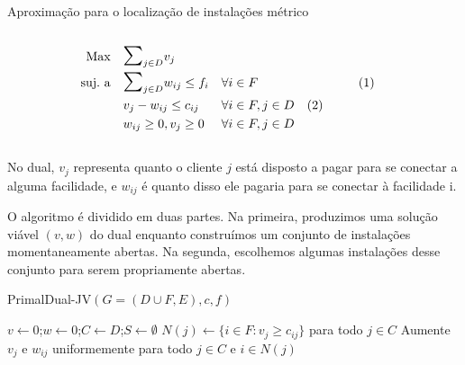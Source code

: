 \documentclass[final]{beamer}
\begin{document}
\begin{frame}[t]
\begin{columns}[t]
\begin{column}{0.48\paperwidth}
\begin{block}{Aproximação para o localização de instalações métrico}
\begin{shaded}
\begin{columns}
        \begin{column}{0.23\paperwidth}
          \begin{subequations}
            \begin{align*}
              \text{Max} \quad & \scalebox{1.5}{$\sum$}_{j \in D} v_{j}\\
              \text{suj.\ a} \quad & \scalebox{1.5}{$\sum$}_{j\in D} w_{ij}\leq f_i && \forall i \in F \hspace{2.8cm} (1)\\
              &v_{j} - w_{ij}\leq c_{ij} && \forall i\in F,j\in D \quad(2)\\
              &w_{ij} \geq 0, v_j\geq 0 && \forall i\in F,j\in D\\
            \end{align*}
          \end{subequations}
        \end{column}
      \end{columns}
      \vspace{-.8cm}
      \end{shaded}

      No dual, $v_j$ representa quanto o cliente $j$ está disposto a pagar para se conectar a alguma facilidade, e $w_{ij}$ é quanto disso ele pagaria para se conectar à facilidade i.

      O algoritmo é dividido em duas partes. Na primeira, produzimos uma solução viável $(v,w)$ do dual enquanto construímos um conjunto de instalações momentaneamente abertas. Na segunda, escolhemos algumas instalações desse conjunto para serem propriamente abertas.

      \begin{shaded}
        \vspace{-.65cm}
      \begin{algorithm}[H]
        \caption{PrimalDual-JV$(G = (D \cup F,E),c,f)$}
              \begin{algorithmic}[1]
            \State $v \gets 0$;\quad $w\gets 0$;\quad $C\gets D$;\quad $S \gets \emptyset$
            \State $N(j) \gets \{i \in F : v_j \geq c_{ij}\}$ para todo $j \in C$
            \State Aumente $v_j$ e $w_{ij}$ uniformemente para todo $j \in C$ e $i \in N(j)$
            

\end{algorithmic}
\end{algorithm}
\end{shaded}
\end{block}
\end{column}
\end{columns}
\end{frame}
\end{document}
